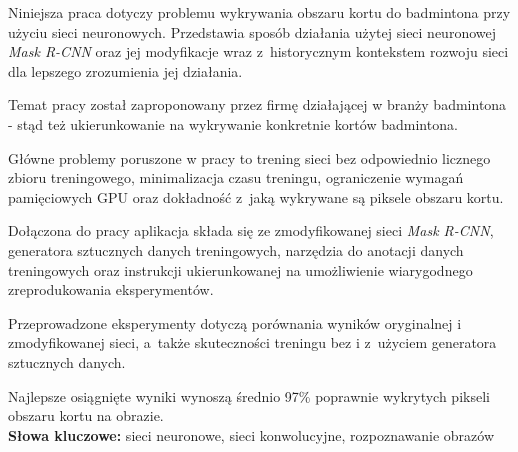 Niniejsza praca dotyczy problemu wykrywania obszaru kortu do badmintona przy użyciu sieci neuronowych.
Przedstawia sposób działania użytej sieci neuronowej \textit{Mask R-CNN} \cite{general-mask-rcnn} oraz jej modyfikacje wraz z~historycznym kontekstem rozwoju sieci dla lepszego zrozumienia jej działania.

Temat pracy został zaproponowany przez firmę \blue{} działającej w branży badmintona - stąd też ukierunkowanie na wykrywanie konkretnie kortów badmintona.

Główne problemy poruszone w pracy to trening sieci bez odpowiednio licznego zbioru treningowego, minimalizacja czasu treningu, ograniczenie wymagań pamięciowych GPU oraz dokładność z~jaką wykrywane są piksele obszaru kortu.

Dołączona do pracy aplikacja składa się ze zmodyfikowanej sieci \textit{Mask R-CNN}, generatora sztucznych danych treningowych, narzędzia do anotacji danych treningowych oraz instrukcji ukierunkowanej na umożliwienie wiarygodnego zreprodukowania eksperymentów.

Przeprowadzone eksperymenty dotyczą porównania wyników oryginalnej i zmodyfikowanej sieci, a~także skuteczności treningu bez i z~użyciem generatora sztucznych danych.

Najlepsze osiągnięte wyniki wynoszą średnio 97\% poprawnie wykrytych pikseli obszaru kortu na obrazie.
\\

\noindent \textbf{Słowa kluczowe:} sieci neuronowe, sieci konwolucyjne, rozpoznawanie obrazów
